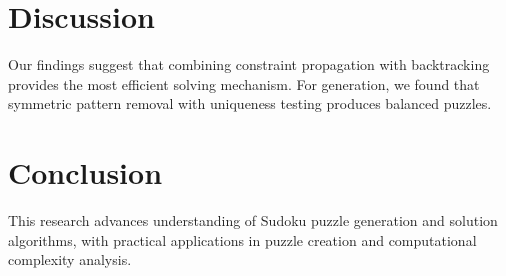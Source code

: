 \documentclass[12pt,a4paper]{article}
\begin{document}
\section{Discussion}
Our findings suggest that combining constraint propagation with backtracking provides the most efficient solving mechanism. For generation, we found that symmetric pattern removal with uniqueness testing produces balanced puzzles.

\section{Conclusion}
This research advances understanding of Sudoku puzzle generation and solution algorithms, with practical applications in puzzle creation and computational complexity analysis.



\end{document}
